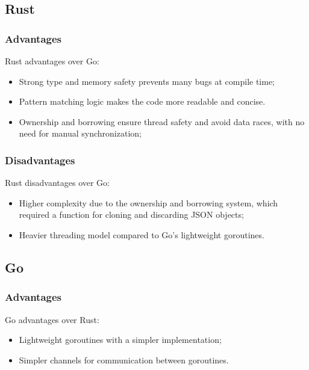 \documentclass[a4paper]{article}
\begin{document}
\subsection{Rust}

\subsubsection{Advantages}

Rust advantages over Go:

\begin{itemize}
  \item Strong type and memory safety prevents many bugs at compile time;
  \item Pattern matching logic makes the code more readable and concise.
  \item Ownership and borrowing ensure thread safety and avoid data races, with no need for manual synchronization;
\end{itemize}


\subsubsection{Disadvantages}

Rust disadvantages over Go:

\begin{itemize}
  \item Higher complexity due to the ownership and borrowing system, which required a function for cloning and discarding JSON objects;
  \item Heavier threading model compared to Go's lightweight goroutines.
\end{itemize}

\clearpage

\subsection{Go}

\subsubsection{Advantages}

Go advantages over Rust:

\begin{itemize}
  \item Lightweight goroutines with a simpler implementation;
  \item Simpler channels for communication between goroutines.
\end{itemize}
\end{document}
